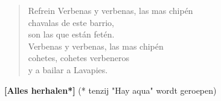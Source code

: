 \begin{verse}{Refrein}
Verbenas y verbenas, las mas chip\'{e}n\\
\chord{}chavalas de este barrio,\\
son las que est\'{a}n fet\'{e}n.\\
Verbenas y verbenas, las mas chip\'{e}n\\
cohetes, cohetes verbeneros\\
y a bailar a Lavapies.\hspace{1.75em}\\
\end{verse}

\textbf{[Alles herhalen*]}\hspace{10em} (* tenzij "Hay aqua" wordt geroepen)